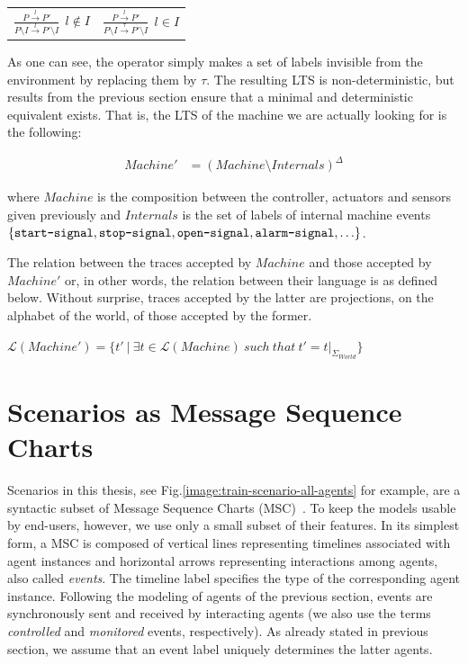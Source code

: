 \begin{center}
\begin{tabular}{cc}
$\frac{\displaystyle P \stackrel{l}{\longrightarrow} P'}{\displaystyle P \setminus I \stackrel{l}{\longrightarrow} P' \setminus I}~~l \notin I$ & 
$\frac{\displaystyle P \stackrel{l}{\longrightarrow} P'}{\displaystyle P \setminus I \stackrel{\tau}{\longrightarrow} P' \setminus I}~~l \in I$ \\
\end{tabular}
\end{center}

As one can see, the operator simply makes a set of labels invisible from the environment by replacing them by $\tau$. The resulting LTS is non-deterministic, but results from the previous section ensure that a minimal and deterministic equivalent exists. That is, the LTS of the machine we are actually looking for is the following:

\vspace{-0.8cm}
\begin{align*}
Machine' &= (Machine \setminus Internals)^\Delta
\end{align*}
\vspace{-0.8cm}

\noindent where $Machine$ is the composition between the controller, actuators and sensors given previously and $Internals$ is the set of labels of internal machine events $\{\texttt{start-signal}, \texttt{stop-signal}, \texttt{open-signal}, \texttt{alarm-signal}, \ldots\}$. 

The relation between the traces accepted by $Machine$ and those accepted by $Machine'$ or, in other words, the relation between their language is as defined below. Without surprise, traces accepted by the latter are projections, on the alphabet of the world, of those accepted by the former.

\begin{center}
$\mathcal{L}(Machine') = \{ t'~|~\exists t \in \mathcal{L}(Machine)~such~that~t' = t|_{\Sigma_{World}}\}$
\end{center}

\section{Scenarios as Message Sequence Charts}

Scenarios in this thesis, see Fig.\ref{image:train-scenario-all-agents} for example, are a syntactic subset of Message Sequence Charts (MSC)~\cite{ITU:1996}. To keep the models usable by end-users, however, we use only a small subset of their features. In its simplest form, a MSC is composed of vertical lines representing timelines associated with agent instances and horizontal arrows representing interactions among agents, also called \emph{events}. The timeline label specifies the type of the corresponding agent instance. Following the modeling of agents of the previous section, events are synchronously sent and received by interacting agents (we also use the terms \emph{controlled} and \emph{monitored} events, respectively). As already stated in previous section, we assume that an event label uniquely determines the latter agents. 

